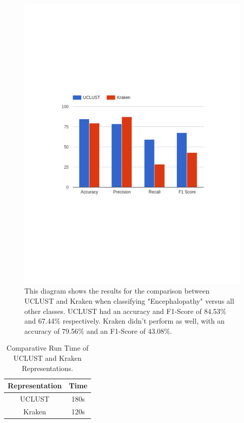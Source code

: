 

\begin{figure}[h]
\centering
\includegraphics[scale=0.5]{./diagrams/PreFeatEng}
\caption{This diagram shows the results for the comparison between UCLUST and Kraken when classifying "Encephalopathy" versus all other classes. UCLUST had an accuracy and F1-Score of 84.53\% and 67.44\% respectively. Kraken didn't perform as well, with an accuracy of 79.56\% and an F1-Score of 43.08\%. \label{prefeature}}
\end{figure}

\begin{table}[t]
\begin{center}
\caption{Comparative Run Time of UCLUST and Kraken Representations. \label{tab:time}}
\begin{tabular}{|c|c|}\hline
Representation & Time\\\hline
UCLUST & 180s\\\hline
Kraken & 120s\\\hline
\end{tabular}
\end{center}
\end{table}


